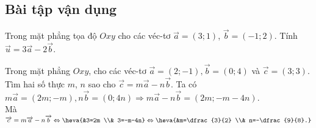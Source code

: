 \subsection{Bài tập vận dụng}
\begin{bt}%
	Trong mặt phẳng tọa độ $Oxy$ cho các véc-tơ $\vec{a}=(3;1)$, $\vec{b}=(-1;2)$. Tính $\vec{u}=3\vec{a}-2\vec{b}$.
\end{bt}

\begin{bt}%
	Trong mặt phẳng $Oxy$, cho các véc-tơ $\overrightarrow{a}=(2;-1),\overrightarrow{b}=(0;4)$ và $\overrightarrow{c}=(3;3)$. Tìm hai số thực $m$, $n$ sao cho $\overrightarrow{c}=m\overrightarrow{a}-n\overrightarrow{b}$.
	\loigiai
	{
		Ta có $m\overrightarrow{a}=(2m;-m),n\overrightarrow{b}=(0;4n) \Rightarrow m\overrightarrow{a}-n\overrightarrow{b}=(2m;-m-4n)$.\\
		Mà $\overrightarrow{c}=m\overrightarrow{a}-n\overrightarrow{b} \Leftrightarrow \heva{&3=2m \\& 3=-m-4n}\Leftrightarrow \heva{&m=\dfrac{3}{2} \\& n=-\dfrac{9}{8}.}$
	}
\end{bt}

